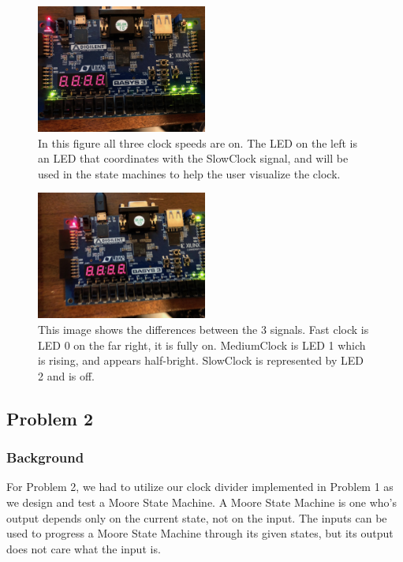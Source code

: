 \documentclass[11pt]{article}
\begin{document}
\begin{center}
\begin{figure}[H]
	\includegraphics[width=0.5\textwidth]{./images/Part1/IMG_0575.jpg}
	\caption{\label{fig:part1img2}In this figure all three clock speeds are on. The LED on the left is an LED that coordinates with the SlowClock signal, and will be used in the state machines to help the user visualize the clock. }
\end{figure}
\end{center}

\begin{center}
\begin{figure}[H]
	\includegraphics[width=0.5\textwidth]{./images/Part1/IMG_0577.jpg}
	\caption{\label{fig:part1img3}This image shows the differences between the 3 signals. Fast clock is LED 0 on the far right, it is fully on. MediumClock is LED 1 which is rising, and appears half-bright. SlowClock is represented by LED 2 and is off.}
\end{figure}
\end{center}

\subsection{Problem 2 }

\subsubsection{Background}
For Problem 2, we had to utilize our clock divider implemented in Problem 1 as we design and test a Moore State Machine. A Moore State Machine is one who's output depends only on the current state, not on the input. The inputs can be used to progress a Moore State Machine through its given states, but its output does not care what the input is. 
\end{document}
